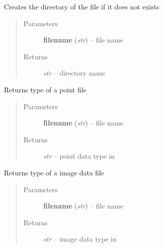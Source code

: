 \documentclass[letterpaper,10pt,english]{sphinxmanual}
\begin{document}

\begin{fulllineitems}
\label{api/ClearMap.IO:ClearMap.IO.IO.createDirectory}
Creates the directory of the file if it does not exists
\begin{quote}\begin{description}
\item[{Parameters}] \leavevmode
\textbf{filename} (\emph{str}) --
file name

\item[{Returns}] \leavevmode
\emph{str} --
directory name

\end{description}\end{quote}

\end{fulllineitems}


\begin{fulllineitems}
\label{api/ClearMap.IO:ClearMap.IO.IO.pointFileNameToType}
Returns type of a point file
\begin{quote}\begin{description}
\item[{Parameters}] \leavevmode
\textbf{filename} (\emph{str}) --
file name

\item[{Returns}] \leavevmode
\emph{str} --
point data type in {\hyperref[api/ClearMap.IO:ClearMap.IO.IO.pointFileTypes]{\emph{}}}

\end{description}\end{quote}

\end{fulllineitems}


\begin{fulllineitems}
\label{api/ClearMap.IO:ClearMap.IO.IO.dataFileNameToType}
Returns type of a image data file
\begin{quote}\begin{description}
\item[{Parameters}] \leavevmode
\textbf{filename} (\emph{str}) --
file name

\item[{Returns}] \leavevmode
\emph{str} --
image data type in {\hyperref[api/ClearMap.IO:ClearMap.IO.IO.dataFileTypes]{\emph{}}}

\end{description}\end{quote}

\end{fulllineitems}
\end{document}
